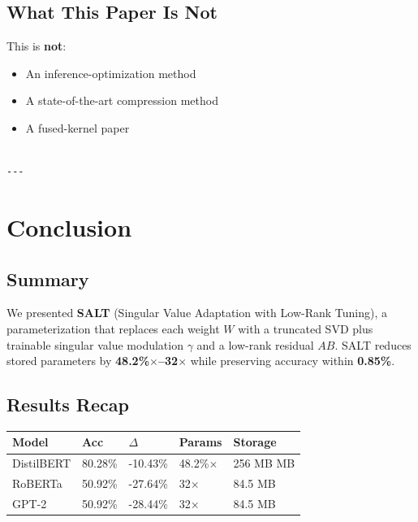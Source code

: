 \subsection{What This Paper Is Not}

This is \textbf{not}:
\begin{itemize}
\item An inference-optimization method
\item A state-of-the-art compression method
\item A fused-kernel paper
\end{itemize}
\begin{lstlisting}

---
\end{lstlisting}


\section{Conclusion}

\subsection{Summary}

We presented \textbf{SALT} (Singular Value Adaptation with Low-Rank Tuning), a 
parameterization that replaces each weight $W$ with a truncated SVD plus 
trainable singular value modulation $\gamma$ and a low-rank residual $AB$. 
SALT reduces stored parameters by \textbf{48.2\%$\times$--32$\times$} 
while preserving accuracy within \textbf{0.85\%}.

\subsection{Results Recap}

\begin{table}[H]
\centering
\small
\begin{tabular}{lllll}
\toprule
\textbf{Model} & \textbf{Acc} & \textbf{$\Delta$} & \textbf{Params} & \textbf{Storage} \\
\midrule
DistilBERT & 80.28\% & -10.43\% & 48.2\%$\times$ & 256 MB MB \\
RoBERTa & 50.92\% & -27.64\% & 32$\times$ & 84.5 MB \\
GPT-2 & 50.92\% & -28.44\% & 32$\times$ & 84.5 MB \\
\bottomrule
\end{tabular}
\end{table}


